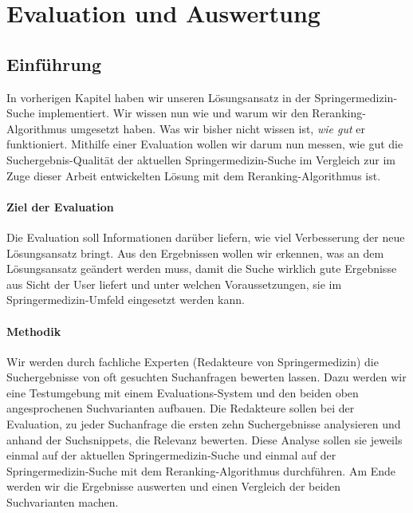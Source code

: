 %
\chapter{Evaluation und Auswertung}
\label{sec:Evaluation}

\section{Einführung}
\label{sec:Evaluation:Einfuehrung}

In vorherigen Kapitel haben wir unseren Lösungsansatz in der Springermedizin-Suche implementiert. Wir wissen nun wie und warum wir den Reranking-Algorithmus umgesetzt haben. Was wir bisher nicht wissen ist, \textit{wie gut} er funktioniert. Mithilfe einer Evaluation wollen wir darum nun messen, wie gut die Suchergebnis-Qualität der aktuellen Springermedizin-Suche im Vergleich zur im Zuge dieser Arbeit entwickelten Lösung mit dem Reranking-Algorithmus ist. 

\subsubsection{Ziel der Evaluation}
\label{sec:Evaluation:Einfuehrung:Ziel}

Die Evaluation soll Informationen darüber liefern, wie viel Verbesserung der neue Lösungsansatz bringt. Aus den Ergebnissen wollen wir erkennen, was an dem Lösungsansatz geändert werden muss, damit die Suche wirklich gute Ergebnisse aus Sicht der User liefert und unter welchen Voraussetzungen, sie im Springermedizin-Umfeld eingesetzt werden kann.

\subsubsection{Methodik}
\label{sec:Evaluation:Einfuehrung:Methodik}
Wir werden durch fachliche Experten (Redakteure von Springermedizin) die Suchergebnisse von oft gesuchten Suchanfragen bewerten lassen. Dazu werden wir eine Testumgebung mit einem Evaluations-System und den beiden oben angesprochenen Suchvarianten aufbauen. Die Redakteure sollen bei der Evaluation, zu jeder Suchanfrage die ersten zehn Suchergebnisse analysieren und anhand der Suchsnippets, die Relevanz bewerten. Diese Analyse sollen sie jeweils einmal auf der aktuellen Springermedizin-Suche und einmal auf der Springermedizin-Suche mit dem Reranking-Algorithmus durchführen. Am Ende werden wir die Ergebnisse auswerten und einen Vergleich der beiden Suchvarianten machen. 

